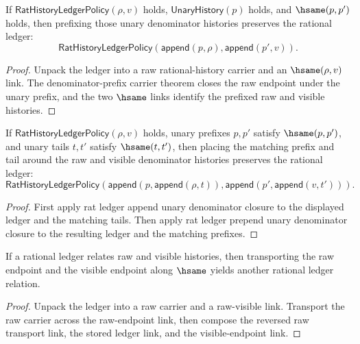 \begin{theorem}
\label{thm:rat-ledger-prepend-unary-denominator-closed}
If $\mathsf{RatHistoryLedgerPolicy}(\rho,v)$ holds,
$\mathsf{UnaryHistory}(p)$ holds, and $\hsame(p,p')$ holds, then prefixing
those unary denominator histories preserves the rational ledger:
$$
\mathsf{RatHistoryLedgerPolicy}(\mathsf{append}(p,\rho),\mathsf{append}(p',v)).
$$
\end{theorem}
\begin{proof}
Unpack the ledger into a raw rational-history carrier and an $\hsame(\rho,v)$
link. The denominator-prefix carrier theorem closes the raw endpoint under the
unary prefix, and the two $\hsame$ links identify the prefixed raw and visible
histories.
\end{proof}

\begin{theorem}
\label{thm:rat-ledger-unary-denominator-context-closed}
If $\mathsf{RatHistoryLedgerPolicy}(\rho,v)$ holds, unary prefixes $p,p'$
satisfy $\hsame(p,p')$, and unary tails $t,t'$ satisfy $\hsame(t,t')$, then
placing the matching prefix and tail around the raw and visible denominator
histories preserves the rational ledger:
$$
\mathsf{RatHistoryLedgerPolicy}(\mathsf{append}(p,\mathsf{append}(\rho,t)),
\mathsf{append}(p',\mathsf{append}(v,t'))).
$$
\end{theorem}
\begin{proof}
First apply rat ledger append unary denominator closure to the displayed ledger
and the matching tails. Then apply rat ledger prepend unary denominator closure
to the resulting ledger and the matching prefixes.
\end{proof}

\begin{theorem}
\label{thm:rat-ledger-hsame-transport}
If a rational ledger relates raw and visible histories, then transporting the
raw endpoint and the visible endpoint along $\hsame$ yields another rational
ledger relation.
\end{theorem}
\begin{proof}
Unpack the ledger into a raw carrier and a raw-visible link. Transport the raw
carrier across the raw-endpoint link, then compose the reversed raw transport
link, the stored ledger link, and the visible-endpoint link.
\end{proof}

